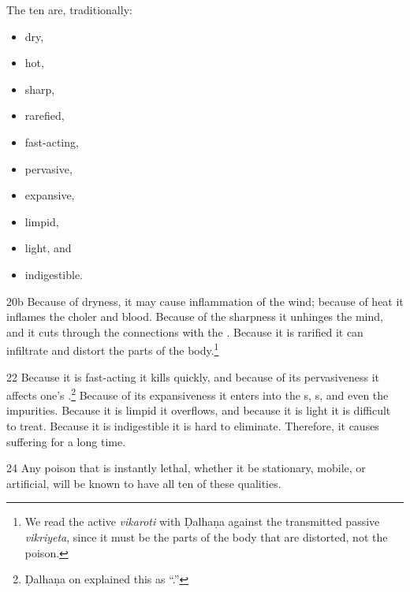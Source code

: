 \begin{translation}
    The ten are, traditionally:
    \begin{itemize}
        \item   dry, %
        \item hot, 
        \item sharp, 
        \item rarefied, %
        \item     fast-acting, 
        \item pervasive, %
        \item expansive, %
        \item limpid, %
        \item     light, and 
        \item indigestible.    
    \end{itemize}
    \item[ 20b]
    Because of dryness, it may cause inflammation of the wind; because of heat
    it inflames the choler and blood. 
    Because of the sharpness it unhinges the
    mind, and it cuts through the connections with the .  Because it is rarified it can infiltrate and distort
    the parts of the body.\footnote{We read the active \emph{vikaroti} with 
    Ḍalhaṇa against the 
    transmitted passive \emph{vikriyeta}, since it must be the parts of the body 
    that are distorted, not the poison.}    
    

\item[22]
Because it is fast-acting it kills quickly, and because of its pervasiveness
it affects one's .\footnote{Ḍalhaṇa
on  explained this as “.”}  Because of its expansiveness it enters
into the s, s, and even the
impurities.  Because it is limpid it overflows, and
because it is light it is difficult to treat.  Because it is indigestible it
is hard to eliminate.  Therefore, it causes suffering for a long time.
    
    \item[ 24]
    Any poison that is instantly lethal, whether it be
    stationary, mobile, or artificial, will be known to 
    have all ten of these qualities.
    
    
  
    

\end{translation}
